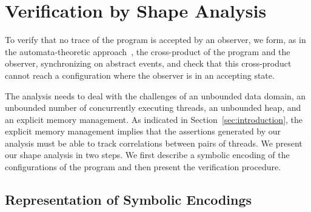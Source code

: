 \section{Verification by Shape Analysis}
\label{sec:annotations}

To verify that no trace of the program is accepted by an observer, we
form, as in the automata-theoretic approach~\cite{VW:modelchecking},
the cross-product of the program and the observer, synchronizing on
abstract events, and check that this cross-product cannot reach a
configuration where the observer is in an accepting state.
%

The analysis needs to deal with the challenges of an unbounded data
domain, an unbounded number of concurrently executing threads, an
unbounded heap, and an explicit memory management.
%
As indicated in Section~\ref{sec:introduction}, the explicit memory
management implies that the assertions generated by our analysis must
be able to track correlations between pairs of threads.
%
%
We present our shape analysis in two steps. We first describe a
symbolic encoding of the configurations of the program and then
present the verification procedure.

\subsection{Representation of Symbolic Encodings}


